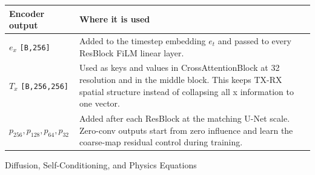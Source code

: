 \documentclass[10pt,landscape]{article}
\newcommand{\shape}[1]{\texttt{[#1]}}
\begin{document}
\vspace{8mm}

\small
\begin{tabular}{>{\raggedright\arraybackslash}p{60mm} >{\raggedright\arraybackslash}p{335mm}}
\toprule
Encoder output & Where it is used \\
\midrule
$e_x$ \shape{B,256} & Added to the timestep embedding $e_t$ and passed to every ResBlock FiLM linear layer. \\
$T_x$ \shape{B,256,256} & Used as keys and values in CrossAttentionBlock at 32 resolution and in the middle block. This keeps TX-RX spatial structure instead of collapsing all x information to one vector. \\
$p_{256},p_{128},p_{64},p_{32}$ & Added after each ResBlock at the matching U-Net scale. Zero-conv outputs start from zero influence and learn the coarse-map residual control during training. \\
\bottomrule
\end{tabular}
\normalsize

\newpage

\begin{center}
{\Large Diffusion, Self-Conditioning, and Physics Equations}
\end{center}
\end{document}
